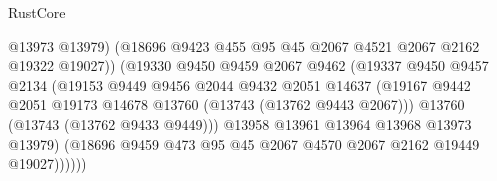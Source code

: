 \begin{lexlean}{RustCore}
\begin{coremodule}
                                        @13973
                                        @13979)
                                      (@18696
                                        @9423
                                        @455
                                        @95
                                        @45
                                        @2067
                                        @4521
                                        @2067
                                        @2162
                                        @19322
                                        @19027))
                                    (@19330
                                      @9450
                                      @9459
                                      @2067
                                      @9462
                                      (@19337
                                        @9450
                                        @9457
                                        @2134
                                        (@19153
                                          @9449
                                          @9456
                                          @2044
                                          @9432
                                          @2051
                                          @14637
                                          (@19167
                                            @9442
                                            @2051
                                            @19173
                                            @14678
                                            @13760
                                            (@13743 (@13762 @9443 @2067)))
                                          @13760
                                          (@13743 (@13762 @9433 @9449)))
                                        @13958
                                        @13961
                                        @13964
                                        @13968
                                        @13973
                                        @13979)
                                      (@18696
                                        @9459
                                        @473
                                        @95
                                        @45
                                        @2067
                                        @4570
                                        @2067
                                        @2162
                                        @19449
                                        @19027))))))

\end{coremodule}
\end{lexlean}
